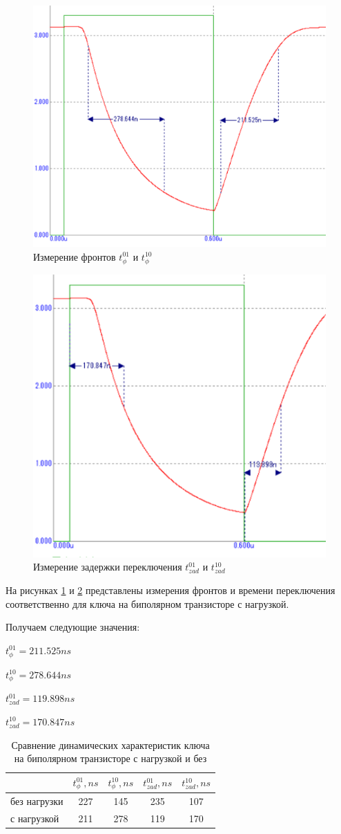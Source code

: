 \documentclass[a4paper,14pt]{article}
\begin{document}
\begin{figure}[H]
	\centering
	\includegraphics[width=0.4\linewidth]{image/BT_graf_nagr_fr}
	\caption{Измерение фронтов $t^{01}_{\phi}$ и $t^{10}_{\phi}$}
	\label{fig:btgrafnagrfr}
\end{figure}

\begin{figure}[H]
	\centering
	\includegraphics[width=0.4\linewidth]{image/BT_graf_nagr_zad}
	\caption{Измерение задержки переключения $t^{01}_{zad}$ и $t^{10}_{zad}$}
	\label{fig:btgrafnagrzad}
\end{figure}


На рисунках \ref{fig:btgrafnagrfr} и \ref{fig:btgrafnagrzad} представлены измерения фронтов и времени переключения соответственно для ключа на биполярном транзисторе с нагрузкой. 

Получаем следующие значения:

$t^{01}_{\phi} = 211.525ns$

$t^{10}_{\phi} = 278.644ns$

$t^{01}_{zad} = 119.898ns$

$t^{10}_{zad} = 170.847ns$

\begin{table}[H]
	\caption{Сравнение динамических характеристик ключа на биполярном транзисторе с нагрузкой и без}
	\centering
	\begin{tabular}{|l|c|c|c|c|}
		\hline
		& $t^{01}_{\phi}, ns$ & $t^{10}_{\phi}, ns$ & $t^{01}_{zad}, ns$ & $t^{10}_{zad}, ns$ \\ \hline
		без нагрузки & 227 & 145 & 235 & 107 \\ \hline
		с нагрузкой & 211 & 278 & 119 & 170 \\ \hline
	\end{tabular}

\label{tab:sr_har}
\end{table}
\end{document}
